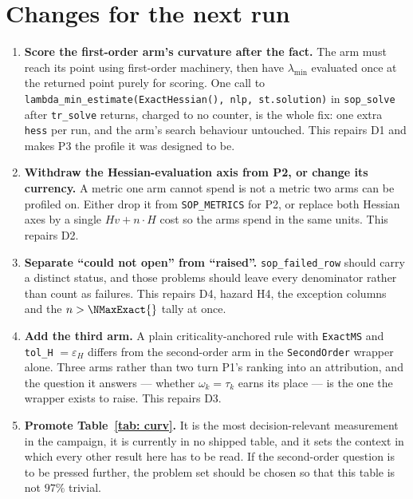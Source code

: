 \documentclass[11pt,a4paper]{article}
\theoremstyle{remark}
\begin{document}
\section{Changes for the next run}\label{sec: next}

\begin{enumerate}[leftmargin=1.8em]
  \item \textbf{Score the first-order arm's curvature after the fact.} The arm
    must reach its point using first-order machinery, then have $\lambda_{\min}$
    evaluated once at the returned point purely for scoring. One call to
    \texttt{lambda\_min\_estimate(ExactHessian(), nlp, st.solution)} in
    \texttt{sop\_solve} after \texttt{tr\_solve} returns, charged to no counter,
    is the whole fix: one extra \texttt{hess} per run, and the arm's search
    behaviour untouched. This repairs D1 and makes P3 the profile it was designed
    to be.
  \item \textbf{Withdraw the Hessian-evaluation axis from P2, or change its
    currency.} A metric one arm cannot spend is not a metric two arms can be
    profiled on. Either drop it from \texttt{SOP\_METRICS} for P2, or replace both
    Hessian axes by a single $Hv + n \cdot H$ cost so the arms spend in the same
    units. This repairs D2.
  \item \textbf{Separate ``could not open'' from ``raised''.}
    \texttt{sop\_failed\_row} should carry a distinct status, and those problems
    should leave every denominator rather than count as failures. This repairs D4,
    hazard H4, the exception columns and the $n > \NMaxExact{}$ tally at once.
  \item \textbf{Add the third arm.} A plain criticality-anchored rule with
    \texttt{ExactMS} and \texttt{tol\_H} $= \varepsilon_H$ differs from the
    second-order arm in the \texttt{SecondOrder} wrapper alone. Three arms rather
    than two turn P1's ranking into an attribution, and the question it answers
    --- whether $\omega_k = \tau_k$ earns its place --- is the one the wrapper
    exists to raise. This repairs D3.
  \item \textbf{Promote Table~\ref{tab: curv}.} It is the most decision-relevant
    measurement in the campaign, it is currently in no shipped table, and it sets
    the context in which every other result here has to be read. If the
    second-order question is to be pressed further, the problem set should be
    chosen so that this table is not $97\%$ trivial.
\end{enumerate}
\end{document}
